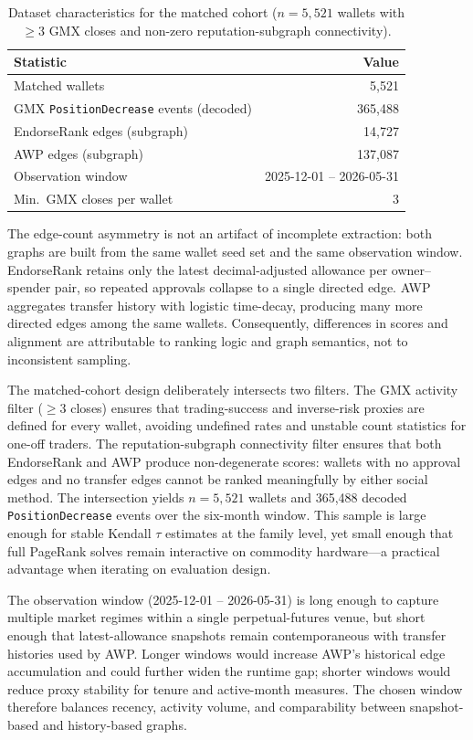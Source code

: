 \begin{table}[htbp]
\centering
\caption{Dataset characteristics for the matched cohort ($n=5{,}521$ wallets with $\geq 3$ GMX closes and non-zero reputation-subgraph connectivity).}
\label{tab:dataset-stats}
\begin{tabular}{lr}
\toprule
Statistic & Value \\
\midrule
Matched wallets & 5{,}521 \\
GMX \texttt{PositionDecrease} events (decoded) & 365{,}488 \\
EndorseRank edges (subgraph) & 14{,}727 \\
AWP edges (subgraph) & 137{,}087 \\
Observation window & 2025-12-01 -- 2026-05-31 \\
Min.\ GMX closes per wallet & 3 \\
\bottomrule
\end{tabular}
\end{table}

The edge-count asymmetry is not an artifact of incomplete extraction: both graphs are built from the same wallet seed set and the same observation window. EndorseRank retains only the latest decimal-adjusted allowance per owner--spender pair, so repeated approvals collapse to a single directed edge. AWP aggregates transfer history with logistic time-decay, producing many more directed edges among the same wallets. Consequently, differences in scores and alignment are attributable to ranking logic and graph semantics, not to inconsistent sampling.

The matched-cohort design deliberately intersects two filters. The GMX activity filter ($\geq 3$ closes) ensures that trading-success and inverse-risk proxies are defined for every wallet, avoiding undefined rates and unstable count statistics for one-off traders. The reputation-subgraph connectivity filter ensures that both EndorseRank and AWP produce non-degenerate scores: wallets with no approval edges and no transfer edges cannot be ranked meaningfully by either social method. The intersection yields $n=5{,}521$ wallets and 365{,}488 decoded \texttt{PositionDecrease} events over the six-month window. This sample is large enough for stable Kendall $\tau$ estimates at the family level, yet small enough that full PageRank solves remain interactive on commodity hardware---a practical advantage when iterating on evaluation design.

The observation window (2025-12-01 -- 2026-05-31) is long enough to capture multiple market regimes within a single perpetual-futures venue, but short enough that latest-allowance snapshots remain contemporaneous with transfer histories used by AWP. Longer windows would increase AWP's historical edge accumulation and could further widen the runtime gap; shorter windows would reduce proxy stability for tenure and active-month measures. The chosen window therefore balances recency, activity volume, and comparability between snapshot-based and history-based graphs.

